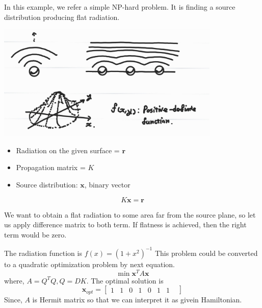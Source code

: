 \begin{example}
    In this example, we refer a simple NP-hard problem.
    It is finding a source distribution producing flat radiation.
    
    \begin{center}
        \includegraphics[width=0.8\textwidth]{media/source_distribution.jpg}
    \end{center}

    \begin{itemize}
        \item Radiation on the given surface = $\mathbf{r}$
        \item Propagation matrix = $K$
        \item Source distribution: $\mathbf{x}$, binary vector
    \end{itemize}
    
    \begin{equation*}
        K\mathbf{x} = \mathbf{r}
    \end{equation*}
    
    We want to obtain a flat radiation to some area far from the source plane, so let us apply difference matrix to both term. 
    If flatness is achieved, then the right term would be zero.

    The radiation function is $f(x) = (1+ x^2)^{-1}$
    This problem could be converted to a quadratic optimization problem by next equation.
    \begin{equation}
        \min \mathbf{x}^T A \mathbf{x}
    \end{equation}
    where, $A = Q^TQ, Q = D K$.
    The optimal solution is 
    \begin{equation*}
        \mathbf{x}_{opt} = \begin{bmatrix}
            1& 1& 0 & 1 & 0 & 1& 1&
        \end{bmatrix}
    \end{equation*}
    Since, $A$ is Hermit matrix so that we can interpret it as givein Hamiltonian.
\end{example}


